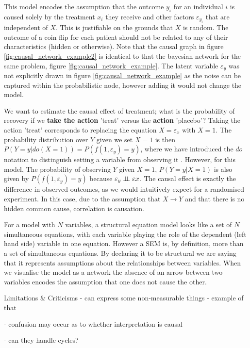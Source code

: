 \documentclass[11pt,a4paper,oneside]{book}
\theoremstyle{plain}
\theoremstyle{definition}
\let\epsilon\varepsilon
\begin{document}
This model encodes the assumption that the outcome $y_{i}$ for an individual $i$ is caused solely by the treatment $x_{i}$ they receive and other factors $\epsilon_{y_{i}}$ that are independent of $X$. This is justifiable on the grounds that $X$ is random. The outcome of a coin flip for each patient should not be related to any of their characteristics (hidden or otherwise). Note that the causal graph in figure \ref{fig:causal_network_example2} is identical to that the bayesian network for the same problem, figure \ref{fig:causal_network_example}. The latent variable $\epsilon_y$ was not explicitly drawn in figure \ref{fig:causal_network_example} as the noise can be captured within the probabilistic node, however adding it would not change the model. 
 

We want to estimate the causal effect of treatment; what is the probability of recovery if we \textbf{take the action} 'treat' versus the \textbf{action} 'placebo'? Taking the action 'treat'  corresponds to replacing the equation $X = \epsilon_{x}$ with $X=1$. The probability distribution over $Y$ given we set $X=1$ is then $P(Y = y|do(X=1)) = P(f(1,\epsilon_{y})=y)$, where we have introduced the $do$ notation to distinguish setting a variable from observing it \cite{Pearl1995}. However, for this model,  The probability of observing $Y$ given $X=1$, $P(Y = y|X = 1)$ is also given by $P(f(1,\epsilon_{y})=y)$ because $\epsilon_{y} \ci \epsilon{x}$. The causal effect is exactly the difference in observed outcomes, as we would intuitively expect for a randomised experiment. In this case, due to the assumption that $X \rightarrow Y$ and that there is no hidden common cause, correlation is causation.  

For a model with $N$ variables, a structural equation model looks like a set of $N$ simultaneous equations, with each variable playing the role of the dependent (left hand side) variable in one equation. However a SEM is, by definition, more than a set of simultaneous equations. By declaring it to be structural we are saying that it represents assumptions about the relationships between variables. When we visualise the model as a network the absence of an arrow between two variables encodes the assumption that one does not cause the other.


Limitations \& Criticisms 
- can express some non-measurable things
	- example of that

- confusion may occur as to whether interpretation is causal

- can they handle cycles?
\end{document}
